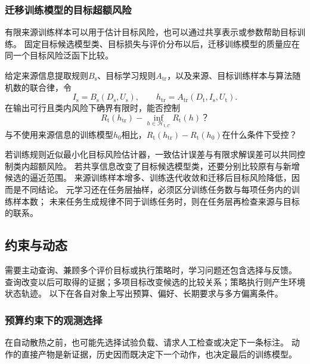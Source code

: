 \subsubsection{迁移训练模型的目标超额风险}
\label{sec:future-analysis-transfer-excess-risk}

有限来源训练样本可以用于估计目标风险，也可以通过共享表示或参数帮助目标训练。
固定目标候选模型类、目标损失与评价分布以后，迁移训练模型的质量应在同一个目标风险泛函下比较。

\begin{mathproblem}[迁移训练模型与目标最佳候选的风险差]
  \label{question:future-transfer-excess-risk}
  给定来源信息提取规则$B_{\mathrm s}$、目标学习规则$A_{\mathrm{tr}}$，以及来源、目标训练样本与算法随机数的联合律，令
  \[
    I_{\mathrm s}=B_{\mathrm s}(D_{\mathrm s},U_{\mathrm s}),\qquad
    h_{\mathrm{tr}}=A_{\mathrm{tr}}(D_{\mathrm t},I_{\mathrm s},U_{\mathrm t}).
  \]
  在输出可行且类内风险下确界有限时，能否控制
  \[
    R_{\mathrm t}(h_{\mathrm{tr}})-\inf_{h\in\mathcal H_{\mathrm t,\mathcal C}}R_{\mathrm t}(h)\text{？}
  \]
  与不使用来源信息的训练模型$h_0$相比，$R_{\mathrm t}(h_{\mathrm{tr}})-R_{\mathrm t}(h_0)$在什么条件下受控？
\end{mathproblem}

若训练规则近似最小化目标风险估计器，一致估计误差与有限求解误差可以共同控制类内超额风险。
若共享信息改变了目标候选模型类，还要分别比较原有与新增候选的逼近范围。
来源训练样本增多、训练迭代收敛和迁移后目标风险降低，因而是不同结论。
元学习还在任务层抽样，必须区分训练任务数与每项任务内的训练样本数；
未来任务生成规律不同于训练任务时，则在任务层再检查来源与目标的联系。

\subsection{约束与动态}
\label{sec:future-feedback-theory-map}

需要主动查询、兼顾多个评价目标或执行策略时，学习问题还包含选择与反馈。
查询改变以后可取得的证据；多项目标改变候选的比较关系；策略执行则产生环境状态轨迹。
以下在各自对象上写出预算、偏好、长期要求与多方偏离条件。

\subsubsection{预算约束下的观测选择}
\label{sec:future-analysis-information-acquisition}

在自动散热之前，也可能先选择试验负载、请求人工检查或决定下一条标注。
动作的直接产物是新证据，历史因而既决定下一个动作，也决定最后的训练模型。

